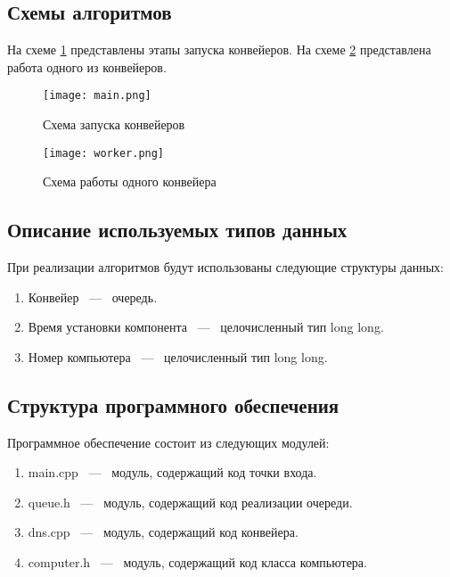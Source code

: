 \subsection{Схемы алгоритмов}

На схеме \ref{img:main} представлены этапы запуска конвейеров.
На схеме \ref{img:worker} представлена работа одного из конвейеров.

\begin{figure}[H]
    \centering
    \texttt{[image: main.png]}
    \caption{Схема запуска конвейеров}
    \label{img:main}
\end{figure}

\begin{figure}[H]
    \centering
    \texttt{[image: worker.png]}
    \caption{Схема работы одного конвейера}
    \label{img:worker}
\end{figure}

\subsection{Описание используемых типов данных}

При реализации алгоритмов будут использованы следующие структуры данных:

\begin{enumerate}
    \item Конвейер ~---~ очередь.
    \item Время установки компонента ~---~ целочисленный тип long long.
    \item Номер компьютера ~---~ целочисленный тип long long.
\end{enumerate}

\subsection{Структура программного обеспечения}

Программное обеспечение состоит из следующих модулей:

\begin{enumerate}
    \item main.cpp ~---~ модуль, содержащий код точки входа.
    \item queue.h  ~---~ модуль, содержащий код реализации очереди.
    \item dns.cpp  ~---~ модуль, содержащий код конвейера.
    \item computer.h ~---~ модуль, содержащий код класса компьютера.
\end{enumerate}

